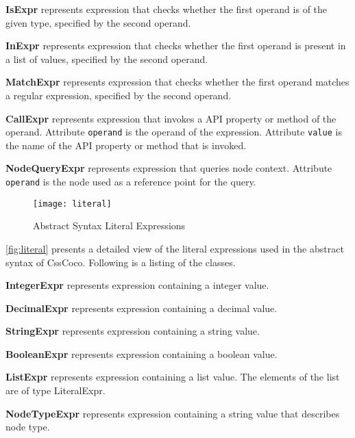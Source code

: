 \begin{description}
\item\textbf{IsExpr} represents expression that checks whether the first operand is of the given type, specified by the second operand.

\item\textbf{InExpr} represents expression that checks whether the first operand is present in a list of values, specified by the second operand.

\item\textbf{MatchExpr} represents expression that checks whether the first operand matches a regular expression, specified by the second operand.

\item\textbf{CallExpr} represents expression that invokes a API property or method of the operand. Attribute \texttt{operand} is the operand of the expression. Attribute \texttt{value} is the name of the API property or method that is invoked.

\item\textbf{NodeQueryExpr} represents expression that queries node context. Attribute \texttt{operand} is the node used as a reference point for the query.

\end{description}

\begin{figure}[h!]
  \centering
  \caption{Abstract Syntax Literal Expressions}
  \label{fig:literal}
  \texttt{[image: literal]}
\end{figure}

\autoref{fig:literal} presents a detailed view of the literal expressions used in the abstract syntax of CssCoco. Following is a listing of the classes. 

\begin{description}

\item\textbf{IntegerExpr} represents expression containing a integer value.

\item\textbf{DecimalExpr} represents expression containing a decimal value.

\item\textbf{StringExpr} represents expression containing a string value.

\item\textbf{BooleanExpr} represents expression containing a boolean value.

\item\textbf{ListExpr} represents expression containing a list value. The elements of the list are of type LiteralExpr.

\item\textbf{NodeTypeExpr} represents expression containing a string value that describes node type.

\end{description}

